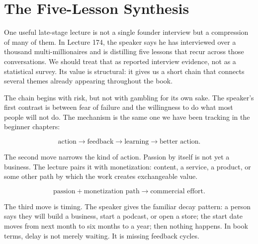 \documentclass[11pt,oneside]{book}
\begin{document}

\section{The Five-Lesson Synthesis}

One useful late-stage lecture is not a single founder interview but a compression of many of them. In Lecture 174, the speaker says he has interviewed over a thousand multi-millionaires and is distilling five lessons that recur across those conversations. We should treat that as reported interview evidence, not as a statistical survey. Its value is structural: it gives us a short chain that connects several themes already appearing throughout the book.

The chain begins with risk, but not with gambling for its own sake. The speaker's first contrast is between fear of failure and the willingness to do what most people will not do. The mechanism is the same one we have been tracking in the beginner chapters:

\begin{equation}
\text{action}
\longrightarrow
\text{feedback}
\longrightarrow
\text{learning}
\longrightarrow
\text{better action}.
\end{equation}

The second move narrows the kind of action. Passion by itself is not yet a business. The lecture pairs it with monetization: content, a service, a product, or some other path by which the work creates exchangeable value.

\begin{equation}
\text{passion}+\text{monetization path}
\longrightarrow
\text{commercial effort}.
\end{equation}

The third move is timing. The speaker gives the familiar decay pattern: a person says they will build a business, start a podcast, or open a store; the start date moves from next month to six months to a year; then nothing happens. In book terms, delay is not merely waiting. It is missing feedback cycles.
\end{document}
